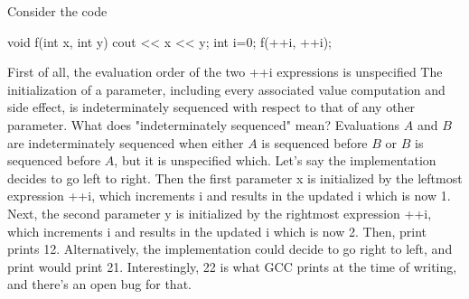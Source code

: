 \documentclass{report}
\begin{document}
    \pagebreak 
    \bigbreak \noindent 
    Consider the code
    \bigbreak \noindent 
    \begin{cppcode}
        void f(int x, int y) {
            cout << x << y;
        }
        int i=0;
        f(++i, ++i);
    \end{cppcode}
    \bigbreak \noindent 
    First of all, the evaluation order of the two ++i expressions is unspecified
    \bigbreak \noindent 
    The initialization of a parameter, including every associated value computation and side effect, is indeterminately sequenced with respect to that of any other parameter.
    \bigbreak \noindent 
    What does "indeterminately sequenced" mean? Evaluations $A$ and $B$ are indeterminately sequenced when either $A$ is sequenced before $B$ or $B$ is sequenced before $A $, but it is unspecified which.
    \bigbreak \noindent 
    Let's say the implementation decides to go left to right. Then the first parameter x is initialized by the leftmost expression ++i, which increments i and results in the updated i which is now 1. Next, the second parameter y is initialized by the rightmost expression ++i, which increments i and results in the updated i which is now 2. Then, print prints 12.
    \bigbreak \noindent 
    Alternatively, the implementation could decide to go right to left, and print would print 21.
    \bigbreak \noindent 
     Interestingly, 22 is what GCC prints at the time of writing, and there's an open bug for that.





























    





    
\end{document}

